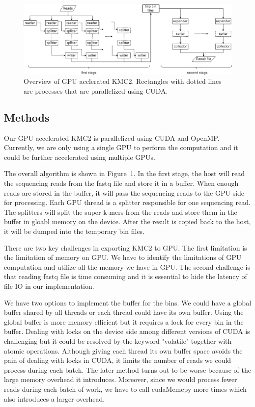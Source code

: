 \documentclass{bioinfo}
\begin{document}
\begin{figure}[t]
	\centering
	\includegraphics[scale=0.5]{kmc2.png}
	\caption{Overview of GPU acclerated KMC2. Rectangles with dotted lines are processes
	that are parallelized using CUDA.}\label{fig:01}
\end{figure}
\newpage
\begin{methods}
\section{Methods}
\enlargethispage{6pt}
Our GPU accelerated KMC2 is parallelized using CUDA and OpenMP. Currently, we are only
using a single GPU to perform the computation and it could be further accelerated using
multiple GPUs.

The overall algorithm is shown in Figure~1\vphantom{\ref{fig:01}}.
In the first stage, the host will read the sequencing reads from the fastq file and store
it in a buffer.
When enough reads are stored in the buffer, it will pass the sequencing reads to the GPU
side for processing.
Each GPU thread is a splitter responsible for one sequencing read. The splitters will
split the super k-mers from the reads and store them in the buffer in gloabl memory on
the device.
After the result is copied back to the host, it will be dumped into the temporary bin
files.

There are two key challenges in exporting KMC2 to GPU.
The first limitation is the limitation of memory on GPU.
We have to identify the limitations of GPU computation and utilize all the memory we have
in GPU.
The second challenge is that reading fastq file is time consuming and it is essential to
hide the latency of file IO in our implementation.

We have two options to implement the buffer for the bins. We could
have a global buffer shared by all threads or each thread could have its own buffer.
Using the global buffer is more memory efficient but it requires a lock for every bin in
the buffer.
Dealing with locks on the device side among different versions of CUDA is challenging but
it could be resolved by the keyword "volatile" together with atomic operations.
Although giving each thread its own buffer space avoids the pain of dealing with locks in
CUDA, it limits the number of reads we could process during each batch.
The later method turns out to be worse because of the large memory overhead it introduces.
Moreover, since we would process fewer reads during each batch of work, we have to call
cudaMemcpy more times which also introduces a larger overhead.


\end{methods}
\end{document}

